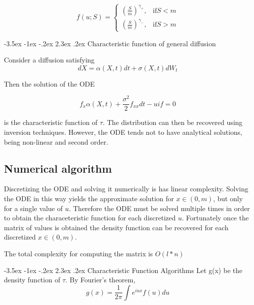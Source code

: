 \documentclass[12pt]{article}
\makeatletter
\renewcommand\section{\@startsection{section}{1}{\z@}%
                                  {-3.5ex \@plus -1ex \@minus -.2ex}%
                                  {2.3ex \@plus.2ex}%
                                  {\normalfont\large\bfseries}}
\makeatother
\begin{document}
\begin{equation}
f(u; S)=\left\{
\begin{array}{rl}
\left(\frac{S}{m} \right) ^ {\gamma_{+}} , & \mathrm{if}  S<m \\
\left(\frac{S}{m} \right) ^ {\gamma_{-}}, & \mathrm{if} S>m
\end{array}
\right.
\end{equation}

\section{Characteristic function of general diffusion}

Consider a diffusion satisfying
\[dX=\alpha(X, t)dt+\sigma(X, t)dW_t\]

Then the solution of the ODE 

\[f_x \alpha(X, t)+ \frac{\sigma^2}{2}f_{xx} dt- uif=0\]

is the characteristic function of \(\tau\).  The distribution can then be recovered using inversion techniques.  However, the ODE tends not to have analytical solutions, being non-linear and second order.  

\subsection{Numerical algorithm}

Discretizing the ODE and solving it numerically is has linear complexity.  Solving the ODE in this way yields the approximate solution for \(x \in (0, m)\), but only for a single value of \(u\).  Therefore the ODE must be solved multiple times in order to obtain the characeteristic function for each discretized \(u\).  Fortunately once the matrix of values is obtained the density function can be recovered for each discretized \(x \in (0, m)\).

The total complexity for computing the matrix is \(O(l*n)\)


\section{Characteristic Function Algorithms}
Let g(x) be the density function of \(\tau\).  By Fourier's theorem, 
\[g(x)=\frac{1}{2\pi} \int e^{iux} f(u) du \]
\end{document}
